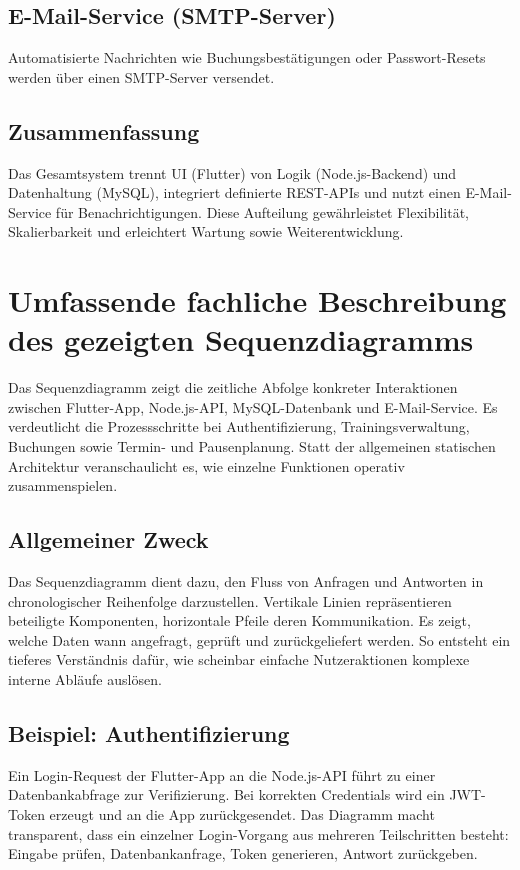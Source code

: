 \section{E-Mail-Service (SMTP-Server)}
Automatisierte Nachrichten wie Buchungsbestätigungen oder Passwort-Resets werden über einen SMTP-Server versendet.

\section{Zusammenfassung}
Das Gesamtsystem trennt UI (Flutter) von Logik (Node.js-Backend) und Datenhaltung (MySQL), integriert definierte REST-APIs
und nutzt einen E-Mail-Service für Benachrichtigungen. Diese Aufteilung gewährleistet Flexibilität, Skalierbarkeit und
erleichtert Wartung sowie Weiterentwicklung.

\chapter{Umfassende fachliche Beschreibung des gezeigten Sequenzdiagramms}
Das Sequenzdiagramm zeigt die zeitliche Abfolge konkreter Interaktionen zwischen Flutter-App, Node.js-API, MySQL-Datenbank und
 E-Mail-Service. Es verdeutlicht die Prozessschritte bei Authentifizierung, Trainingsverwaltung, Buchungen sowie Termin- und 
 Pausenplanung. Statt der allgemeinen statischen Architektur veranschaulicht es, wie einzelne Funktionen operativ zusammenspielen.

\section{Allgemeiner Zweck}
Das Sequenzdiagramm dient dazu, den Fluss von Anfragen und Antworten in chronologischer Reihenfolge darzustellen. Vertikale 
Linien repräsentieren beteiligte Komponenten, horizontale Pfeile deren Kommunikation. Es zeigt, welche Daten wann angefragt, 
geprüft und zurückgeliefert werden. So entsteht ein tieferes Verständnis dafür, wie scheinbar einfache Nutzeraktionen komplexe
 interne Abläufe auslösen.

\section{Beispiel: Authentifizierung}
Ein Login-Request der Flutter-App an die Node.js-API führt zu einer Datenbankabfrage zur Verifizierung. Bei korrekten Credentials
 wird ein JWT-Token erzeugt und an die App zurückgesendet. Das Diagramm macht transparent, dass ein einzelner Login-Vorgang aus 
 mehreren Teilschritten besteht: Eingabe prüfen, Datenbankanfrage, Token generieren, Antwort zurückgeben.


